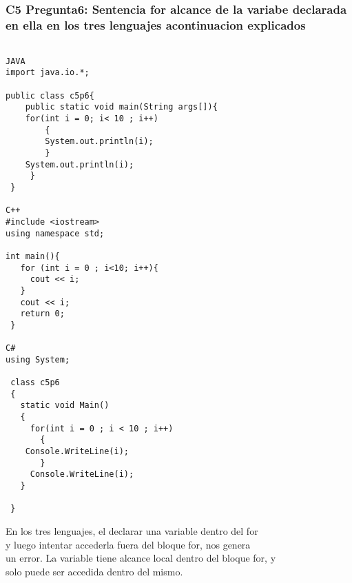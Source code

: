 \subsubsection{C5 Pregunta6: Sentencia for alcance de la variabe declarada en ella en los tres lenguajes acontinuacion explicados }

\begin{verbatim}

JAVA
import java.io.*;
 
public class c5p6{
    public static void main(String args[]){
 	for(int i = 0; i< 10 ; i++)
 	    {
 		System.out.println(i);
 	    }
 	System.out.println(i);
     }
 }

C++
#include <iostream>
using namespace std;
 
int main(){
   for (int i = 0 ; i<10; i++){
     cout << i;
   }
   cout << i; 
   return 0;
 }

C#
using System;
 
 class c5p6
 {
   static void Main()
   {
     for(int i = 0 ; i < 10 ; i++)
       {
 	Console.WriteLine(i);
       }
     Console.WriteLine(i);
   }
 
 }

\end{verbatim}
En los tres lenguajes, el declarar una variable dentro del for\\
y luego intentar accederla fuera del bloque for, nos genera \\
un error. La variable tiene alcance local dentro del bloque for, y \\
solo puede ser accedida dentro del mismo.

